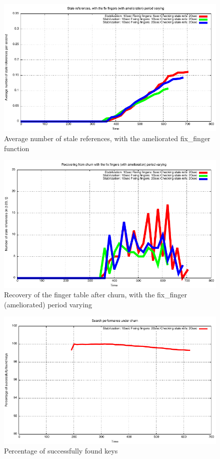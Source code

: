 \documentclass[a4paper, 11pt]{article}
\theoremstyle{plain}
\theoremstyle{definition}
\begin{document}
    \begin{figure}[h]
      \centering
      \includegraphics{plots/Average-SR-fix-fingers-ameliorated.pdf}
      \caption{Average number of stale references, with the ameliorated fix\_finger function}
      \label{fig:Av-SR-fix-finger-am}
    \end{figure}

    \begin{figure}[h]
      \centering
      \includegraphics{plots/Rec-SR-fix-fingers-ameliorated.pdf}
      \caption{Recovery of the finger table after churn, with the fix\_finger (ameliorated) period varying}
      \label{fig:Rec-SR-fix-finger-am}
    \end{figure}
    

    \begin{figure}[h]
      \centering
      \includegraphics{plots/task3-5.pdf}
      \caption{Percentage of successfully found keys}
      \label{fig:percentage-successfully-found-keys}
    \end{figure}
\end{document}

